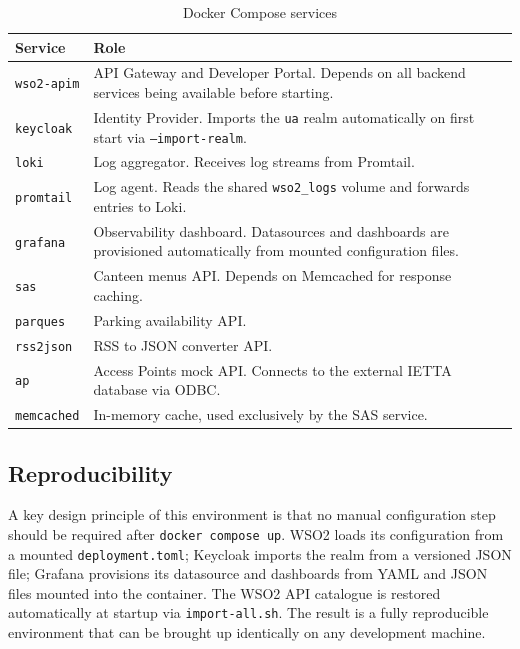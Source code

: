 \documentclass[12pt, a4paper]{report}
\begin{document}
\begin{table}[H]
    \centering
    \caption{Docker Compose services}
    \label{tab:services}
    \begin{tabular}{lp{9cm}}
        \toprule
        \textbf{Service} & \textbf{Role} \\
        \midrule
        \texttt{wso2-apim}  & API Gateway and Developer Portal. Depends on all backend
                              services being available before starting. \\
        \texttt{keycloak}   & Identity Provider. Imports the \texttt{ua} realm automatically
                              on first start via \texttt{--import-realm}. \\
        \texttt{loki}       & Log aggregator. Receives log streams from Promtail. \\
        \texttt{promtail}   & Log agent. Reads the shared \texttt{wso2\_logs} volume and
                              forwards entries to Loki. \\
        \texttt{grafana}    & Observability dashboard. Datasources and dashboards are
                              provisioned automatically from mounted configuration files. \\
        \texttt{sas}        & Canteen menus API. Depends on Memcached for response caching. \\
        \texttt{parques}    & Parking availability API. \\
        \texttt{rss2json}   & RSS to JSON converter API. \\
        \texttt{ap}         & Access Points mock API. Connects to the external IETTA
                              database via ODBC. \\
        \texttt{memcached}  & In-memory cache, used exclusively by the SAS service. \\
        \bottomrule
    \end{tabular}
\end{table}

\subsection{Reproducibility}
A key design principle of this environment is that no manual configuration step should
be required after \texttt{docker compose up}. WSO2 loads its configuration from a
mounted \texttt{deployment.toml}; Keycloak imports the realm from a versioned JSON file;
Grafana provisions its datasource and dashboards from YAML and JSON files mounted into
the container. The WSO2 API catalogue is restored automatically at startup via
\texttt{import-all.sh}. The result is a fully reproducible environment that can be
brought up identically on any development machine.
\end{document}
